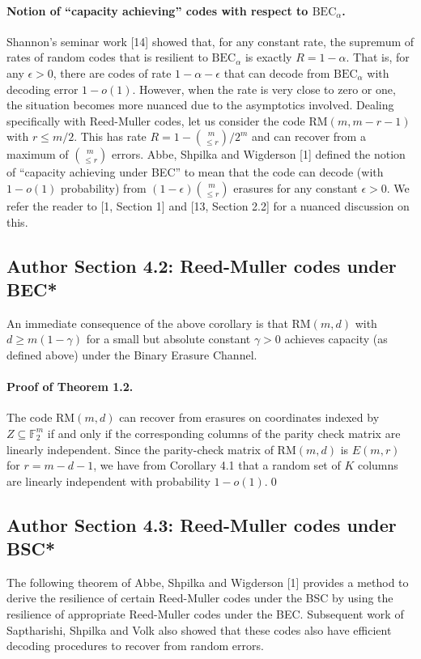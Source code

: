 \documentclass[10pt,a4paper]{article}
\begin{document}
\paragraph{Notion of ``capacity achieving'' codes with respect to $\mathrm{BEC}_\alpha$.} Shannon's seminar work [14] showed that, for any constant rate, the supremum of rates of random codes that is resilient to $\mathrm{BEC}_\alpha$ is exactly $R=1-\alpha$. That is, for any $\epsilon>0$, there are codes of rate $1-\alpha-\epsilon$ that can decode from $\mathrm{BEC}_\alpha$ with decoding error $1-o(1)$. However, when the rate is very close to zero or one, the situation becomes more nuanced due to the asymptotics involved.
Dealing specifically with Reed-Muller codes, let us consider the code $\mathrm{RM}(m,m-r-1)$ with $r\le m/2$. This has rate $R=1-\binom m{\le r}/2^m$ and can recover from a maximum of $\binom m{\le r}$ errors. Abbe, Shpilka and Wigderson [1] defined the notion of ``capacity achieving under BEC'' to mean that the code can decode (with $1-o(1)$ probability) from $(1-\epsilon)\binom m{\le r}$ erasures for any constant $\epsilon>0$. We refer the reader to [1, Section 1] and [13, Section 2.2] for a nuanced discussion on this.
\subsection*{Author Section 4.2: Reed-Muller codes under BEC*}
An immediate consequence of the above corollary is that $\mathrm{RM}(m,d)$ with $d\ge m(1-\gamma)$ for a small but absolute constant $\gamma>0$ achieves capacity (as defined above) under the Binary Erasure Channel.
\paragraph{Proof of Theorem 1.2.} The code $\mathrm{RM}(m,d)$ can recover from erasures on coordinates indexed by $Z\subseteq\mathbb F_2^m$ if and only if the corresponding columns of the parity check matrix are linearly independent. Since the parity-check matrix of $\mathrm{RM}(m,d)$ is $E(m,r)$ for $r=m-d-1$, we have from Corollary 4.1 that a random set of $K$ columns are linearly independent with probability $1-o(1)$.\qed
\subsection*{Author Section 4.3: Reed-Muller codes under BSC*}
The following theorem of Abbe, Shpilka and Wigderson [1] provides a method to derive the resilience of certain Reed-Muller codes under the BSC by using the resilience of appropriate Reed-Muller codes under the BEC. Subsequent work of Saptharishi, Shpilka and Volk also showed that these codes also have efficient decoding procedures to recover from random errors.
\end{document}
